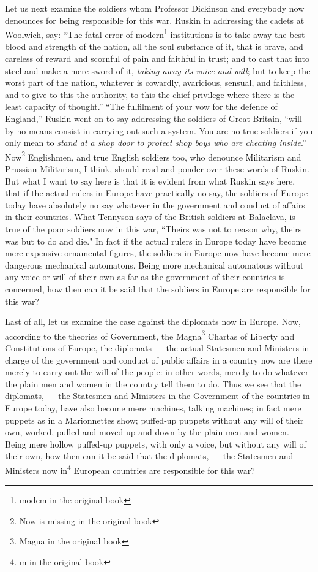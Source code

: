 Let us next examine the soldiers whom Professor Dickinson and everybody now denounces for being responsible for this war.
Ruskin in addressing the cadets at Woolwich, say: ``The fatal error of modern\footnote{modem in the original book} institutions is to take away the best blood and strength of the nation, all the soul substance of it, that is brave, and careless of reward and scornful of pain and faithful in trust; and to cast that into steel and make a mere sword of it, \emph{taking away its voice and will}; but to keep the worst part of the nation, whatever is cowardly, avaricious, sensual, and faithless, and to give to this the authority, to this the chief privilege where there is the least capacity of thought.''
``The fulfilment of your vow for the defence of England,'' Ruskin went on to say addressing the soldiers of Great Britain, ``will by no means consist in carrying out such a system. You are no true soldiers if you only mean to \emph{stand at a shop door to protect shop boys who are cheating inside}.''
Now\footnote{Now is missing in the original book} Englishmen, and true English soldiers too, who denounce Militarism and Prussian Militarism, I think, should read and ponder over these words of Ruskin.
But what I want to say here is that it is evident from what Ruskin says here, that if the actual rulers in Europe have practically no say, the soldiers of Europe today have absolutely no say whatever in the government and conduct of affairs in their countries.
What Tennyson says of the British soldiers at Balaclava, is true of the poor soldiers now in this war, ``Theirs was not to reason why, theirs was but to do and die." 
In fact if the actual rulers in Europe today have become mere expensive ornamental figures, the soldiers in Europe now have become mere dangerous mechanical automatons.
Being more mechanical automatons without any voice or will of their own as far as the government of their countries is concerned, how then can it be said that the soldiers in Europe are responsible for this war?

Last of all, let us examine the case against the diplomats now in Europe.
Now, according to the theories of Government, the Magna\footnote{Magua in the original book} Chartas of Liberty and Constitutions of Europe, the diplomats --- the actual Statesmen and Ministers in charge of the government and conduct of public affairs in a country now are there merely to carry out the will of the people: in other words, merely to do whatever the plain men and women in the country tell them to do.
Thus we see that the diplomats, --- the Statesmen and Ministers in the Government of the countries in Europe today, have also become mere machines, talking machines; in fact mere puppets as in a Marionnettes show; puffed-up puppets without any will of their own, worked, pulled and moved up and down by the plain men and women.
Being mere hollow puffed-up puppets, with only a voice, but without any will of their own, how then can it be said that the diplomats, --- the Statesmen and Ministers now in\footnote{m in the original book} European countries are responsible for this war?

